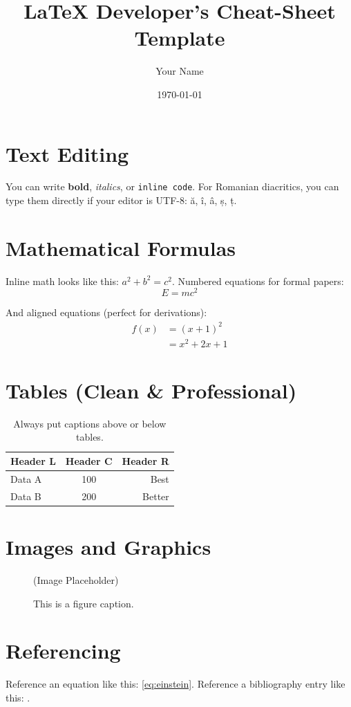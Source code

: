 \documentclass[12pt, a4paper]{article}
\title{LaTeX Developer's Cheat-Sheet Template}
\author{Your Name}
\date{\today}
\begin{document}
\maketitle

\section{Text Editing}
You can write \textbf{bold}, \textit{italics}, or \texttt{inline code}. 
For Romanian diacritics, you can type them directly if your editor is UTF-8: ă, î, â, ș, ț.

\section{Mathematical Formulas}
Inline math looks like this: $a^2 + b^2 = c^2$. 
Numbered equations for formal papers:
\begin{equation}
    E = mc^2 \label{eq:einstein}
\end{equation}

And aligned equations (perfect for derivations):
\begin{align}
    f(x) &= (x+1)^2 \\
         &= x^2 + 2x + 1
\end{align}

\section{Tables (Clean \& Professional)}
\begin{table}[ht]
    \centering
    \begin{tabular}{lcr} 
        \toprule
        \textbf{Header L} & \textbf{Header C} & \textbf{Header R} \\
        \midrule
        Data A & 100 & Best \\
        Data B & 200 & Better \\
        \bottomrule
    \end{tabular}
    \caption{Always put captions above or below tables.}
\end{table}

\section{Images and Graphics}
\begin{figure}[ht]
    \centering
    \small (Image Placeholder)
    \caption{This is a figure caption.}
    \label{fig:example}
\end{figure}

\section{Referencing}
Reference an equation like this: \ref{eq:einstein}. 
Reference a bibliography entry like this: \cite{label_from_zotero}.

\end{document}
